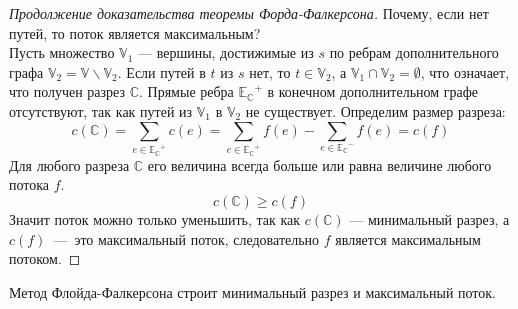 \documentclass[russian]{lecture-notes}
\newenvironment{centeredgraph}[3]
{
	\begin{center}
		\begin{tikzpicture}[every node/.style={#1}, every edge/.style={#2}, every path/.style={#3}]
	}
	{
		\end{tikzpicture}
	\end{center}
}
\begin{document}
	
	\begin{proof}[Продолжение доказательства теоремы Форда-Фалкерсона]
		Почему, если нет путей, то поток является максимальным?\\[1ex]
		Пусть множество $\mathbb{V}_1$ --- вершины, достижимые из $s$ по ребрам дополнительного графа $\mathbb{V}_2 = \mathbb{V} \backslash \mathbb{V}_2$. Если путей в $t$ из $s$ нет, то $t \in \mathbb{V}_2$, а $\mathbb{V}_1 \cap \mathbb{V}_2 = \emptyset$, что означает, что получен разрез $\mathbb{C}$. Прямые ребра $\mathbb{E_C}^+$ в конечном дополнительном графе отсутствуют, так как путей из $\mathbb{V}_1$ в $\mathbb{V}_2$ не существует. Определим размер разреза:
		$$c(\mathbb{C}) = \sum_{e \in \mathbb{E_C}^+} c(e) = \sum_{e \in \mathbb{E_C}^+} f(e) - \sum_{e \in \mathbb{E_C}^-} f(e) = c(f)$$
		Для любого разреза $\mathbb{C}$ его величина всегда больше или равна величине любого потока $f$.
		$$c(\mathbb{C}) \geq c(f)$$
		Значит поток можно только уменьшить, так как $c(\mathbb{C})$ --- минимальный разрез, а $c(f)$~---~это максимальный поток, следовательно $f$ является максимальным потоком.
	\end{proof}
	
	\begin{corollary}
		Метод Флойда-Фалкерсона строит минимальный разрез и максимальный поток.
	\end{corollary}
	
\end{document}
